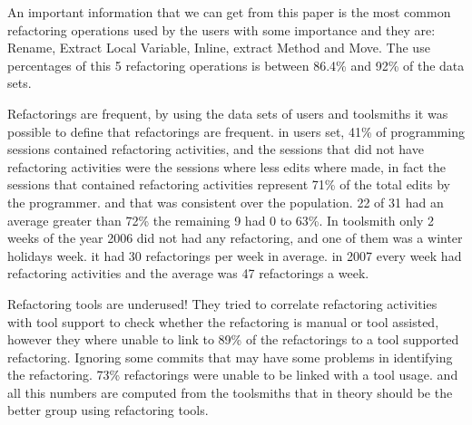 An important information that we can get from this paper is the most common refactoring operations used by the users with some importance and they are: Rename, Extract Local Variable, Inline, extract Method and Move. The use percentages of this 5 refactoring operations is between 86.4\% and 92\% of the data sets. %

Refactorings are frequent, by using the data sets of users and toolsmiths it was possible to define that refactorings are frequent. in users set, 41\% of programming sessions contained refactoring activities, and the sessions that did not have refactoring activities were the sessions where less edits where made, in fact the sessions that contained refactoring activities represent 71\% of the total edits by the programmer. and that was consistent over the population. 22 of 31 had an average greater than 72\% the remaining 9 had 0 to 63\%. 
In toolsmith only 2 weeks of the year 2006 did not had any refactoring, and one of them was a winter holidays week. it had 30 refactorings per week in average. in 2007 every week had refactoring activities and the average was 47 refactorings a week.

Refactoring tools are underused! They tried to correlate refactoring activities with tool support to check whether the refactoring is manual or tool assisted, however they where unable to link to 89\% of the refactorings to a tool supported refactoring. Ignoring some commits that may have some problems in identifying the refactoring. 73\% refactorings were unable to be linked with a tool usage. and all this numbers are computed from the toolsmiths that in theory should be the better group using refactoring tools.


